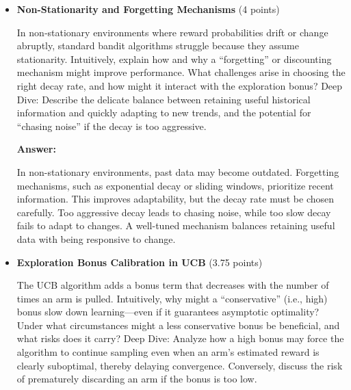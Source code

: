 \documentclass[12pt]{article}
\begin{document}
{{{\begin{itemize}[noitemsep]
    \textbf{Answer:}

    A hybrid strategy could monitor metrics like reward variance, Q-value stabilization, or reward drops to decide when to switch from explore-first to UCB. For instance, if the variance of rewards or changes in Q-values fall below a threshold, it might indicate sufficient exploration. Early exploitation might capture transient rewards that UCB would delay discovering. Such a meta-strategy could outperform either algorithm by being more responsive to observed data.

    \item \textbf{Non-Stationarity and Forgetting Mechanisms} (4 points)

    \vspace{0.25cm}
    In non‑stationary environments where reward probabilities drift or change abruptly, standard bandit algorithms struggle because they assume stationarity. Intuitively, explain how and why a “forgetting” or discounting mechanism might improve performance. What challenges arise in choosing the right decay rate, and how might it interact with the exploration bonus?
    Deep Dive:
    Describe the delicate balance between retaining useful historical information and quickly adapting to new trends, and the potential for “chasing noise” if the decay is too aggressive.
    \vspace{0.5cm}

    \textbf{Answer:}

    In non-stationary environments, past data may become outdated. Forgetting mechanisms, such as exponential decay or sliding windows, prioritize recent information. This improves adaptability, but the decay rate must be chosen carefully. Too aggressive decay leads to chasing noise, while too slow decay fails to adapt to changes. A well-tuned mechanism balances retaining useful data with being responsive to change.

    \item \textbf{Exploration Bonus Calibration in UCB} (3.75 points)

    \vspace{0.25cm}
    The UCB algorithm adds a bonus term that decreases with the number of times an arm is pulled. Intuitively, why might a “conservative” (i.e., high) bonus slow down learning—even if it guarantees asymptotic optimality? Under what circumstances might a less conservative bonus be beneficial, and what risks does it carry?
    Deep Dive:
    Analyze how a high bonus may force the algorithm to continue sampling even when an arm’s estimated reward is clearly suboptimal, thereby delaying convergence. Conversely, discuss the risk of prematurely discarding an arm if the bonus is too low.
    \vspace{0.5cm}


\end{itemize}}}}
\end{document}
